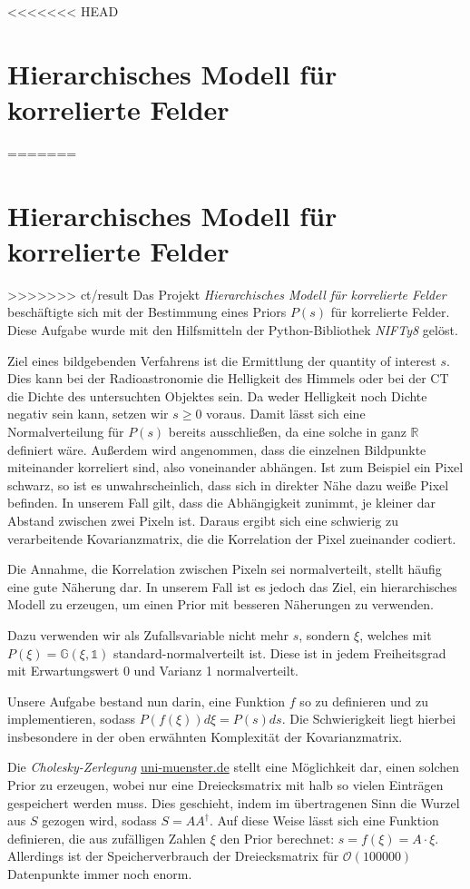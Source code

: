 <<<<<<< HEAD
\section{Hierarchisches Modell für korrelierte Felder}\label{k4.2.hiera}
=======
\section{Hierarchisches Modell für korrelierte Felder}\label{k4.2.hmodel}
>>>>>>> ct/result
Das Projekt \emph{Hierarchisches Modell für korrelierte Felder} beschäftigte sich mit der Bestimmung eines Priors $P(s)$ für korrelierte Felder. Diese Aufgabe wurde mit den Hilfsmitteln der Python-Bibliothek \emph{NIFTy8} gelöst.

Ziel eines bildgebenden Verfahrens ist die Ermittlung der quantity of interest $s$. Dies kann bei der Radioastronomie die Helligkeit des Himmels oder bei der CT die Dichte des untersuchten Objektes sein. Da weder Helligkeit noch Dichte negativ sein kann, setzen wir $s \geq 0$ voraus. Damit lässt sich eine Normalverteilung für $P(s)$ bereits ausschließen, da eine solche in ganz $\mathbb{R}$ definiert wäre. Außerdem wird angenommen, dass die einzelnen Bildpunkte miteinander korreliert sind, also voneinander abhängen. Ist zum Beispiel ein Pixel schwarz, so ist es unwahrscheinlich, dass sich in direkter Nähe dazu weiße Pixel befinden. In unserem Fall gilt, dass die Abhängigkeit zunimmt, je kleiner dar Abstand zwischen zwei Pixeln ist. Daraus ergibt sich eine schwierig zu verarbeitende Kovarianzmatrix, die die Korrelation der Pixel zueinander codiert.

Die Annahme, die Korrelation zwischen Pixeln sei normalverteilt, stellt häufig eine gute Näherung dar. In unserem Fall ist es jedoch das Ziel, ein hierarchisches Modell zu erzeugen, um einen Prior mit besseren Näherungen zu verwenden.

Dazu verwenden wir als Zufallsvariable nicht mehr $s$, sondern $\xi$, welches mit $P(\xi) = \mathbb{G}(\xi, \mathds{1})$ standard-normalverteilt ist. Diese ist in jedem Freiheitsgrad mit Erwartungswert 0 und Varianz 1 normalverteilt.

Unsere Aufgabe bestand nun darin, eine Funktion $f$ so zu definieren und zu implementieren, sodass $P(f(\xi)) d \xi = P(s) ds$. Die Schwierigkeit liegt hierbei insbesondere in der oben erwähnten Komplexität der Kovarianzmatrix.

Die \emph{Cholesky-Zerlegung} \href{https://www.uni-muenster.de/AMM/num/Vorlesungen/Numerik1_WS06/loesungen06/Prog_cholesky.pdf}{uni-muenster.de}
stellt eine Möglichkeit dar, einen solchen Prior zu erzeugen, wobei nur eine Dreiecksmatrix mit halb so vielen Einträgen gespeichert werden muss. Dies geschieht, indem im übertragenen Sinn die Wurzel aus $S$ gezogen wird, sodass $S=A A^{\dagger}$. Auf diese Weise lässt sich eine Funktion definieren, die aus zufälligen Zahlen $\xi$ den Prior berechnet: $s = f(\xi) = A \cdot \xi$. Allerdings ist der Speicherverbrauch der Dreiecksmatrix für $\mathcal{O}(100 000)$ Datenpunkte immer noch enorm.

